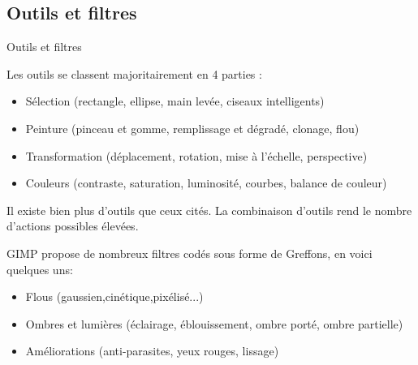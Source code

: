 \documentclass[french]{beamer}
\begin{document}
        \subsection{Outils et filtres}
            \begin{frame}{Outils et filtres}
                \tableofcontents[sectionstyle=show/hide,subsectionstyle=show/shaded/hide]
            \end{frame}
            \begin{frame}
                Les outils se classent majoritairement en 4 parties :
                \begin{itemize}
                    \item Sélection (rectangle, ellipse, main levée, ciseaux intelligents)
                    \item Peinture (pinceau et gomme, remplissage et dégradé, clonage, flou)
                    \item Transformation (déplacement, rotation, mise à l'échelle, perspective)
                    \item Couleurs (contraste, saturation, luminosité, courbes, balance de couleur)
                \end{itemize}
                Il existe bien plus d'outils que ceux cités. La combinaison d'outils rend le nombre d'actions possibles élevées.
            \end{frame}
            \begin{frame}
                GIMP propose de nombreux filtres codés sous forme de Greffons, en voici quelques uns:
                \begin{itemize}
                \item Flous (gaussien,cinétique,pixélisé...)
                \item Ombres et lumières (éclairage, éblouissement, ombre porté, ombre partielle)
                \item Améliorations (anti-parasites, yeux rouges, lissage)
                \end{itemize}
            \end{frame}
\end{document}
